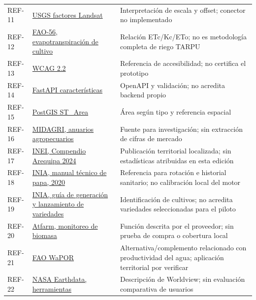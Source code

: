 \documentclass[10pt,a4paper]{article}
\begin{document}
\begin{longtable}{>{\raggedright\arraybackslash}p{3.647cm}>{\raggedright\arraybackslash}p{5.867cm}>{\raggedright\arraybackslash}p{6.343cm}}
REF-11 & \href{https://www.usgs.gov/faqs/how-do-i-use-a-scale-factor-landsat-level-2-science-products}{USGS factores Landsat} & Interpretación de escala y offset; conector no implementado \\[3pt]
REF-12 & \href{https://www.fao.org/4/X0490E/x0490e0a.htm}{FAO-56, evapotranspiración de cultivo} & Relación ETc/\allowbreak{}Kc/\allowbreak{}ETo; no es metodología completa de riego TARPU \\[3pt]
REF-13 & \href{https://www.w3.org/TR/WCAG22/}{WCAG 2.2} & Referencia de accesibilidad; no certifica el prototipo \\[3pt]
REF-14 & \href{https://fastapi.tiangolo.com/features/}{FastAPI características} & OpenAPI y validación; no acredita backend propio \\[3pt]
REF-15 & \href{https://postgis.net/docs/ST_Area.html}{PostGIS ST\_\allowbreak{}Area} & Área según tipo y referencia espacial \\[3pt]
REF-16 & \href{https://www.gob.pe/institucion/midagri/colecciones/5149-anuarios-estadisticas-de-produccion-agropecuaria}{MIDAGRI, anuarios agropecuarios} & Fuente para investigación; sin extracción de cifras de mercado \\[3pt]
REF-17 & \href{https://www.gob.pe/institucion/inei/informes-publicaciones/6453267-compendio-estadistico-arequipa-2024}{INEI, Compendio Arequipa 2024} & Publicación territorial localizada; sin estadísticas atribuidas en esta edición \\[3pt]
REF-18 & \href{https://repositorio.inia.gob.pe/handle/20.500.12955/1146}{INIA, manual técnico de papa, 2020} & Referencia para rotación e historial sanitario; no calibración local del motor \\[3pt]
REF-19 & \href{https://repositorio.inia.gob.pe/bitstreams/0d597e50-7526-41fe-92a5-d158d88bff55/download}{INIA, guía de generación y lanzamiento de variedades} & Identificación de cultivos; no acredita variedades seleccionadas para el piloto \\[3pt]
REF-20 & \href{https://support.at.farm/hc/es-es/articles/18253470818332--C\%C3\%B3mo-puedo-monitorear-la-biomasa-de-mi-parcela}{Atfarm, monitoreo de biomasa} & Función descrita por el proveedor; sin prueba de compra o cobertura local \\[3pt]
REF-21 & \href{https://www.fao.org/land-water/resources/tools/databases/wapor/en}{FAO WaPOR} & Alternativa/\allowbreak{}complemento relacionado con productividad del agua; aplicación territorial por verificar \\[3pt]
REF-22 & \href{https://www.earthdata.nasa.gov/home}{NASA Earthdata, herramientas} & Descripción de Worldview; sin evaluación comparativa de usuarios \\[3pt]
\end{longtable}
\endgroup
\end{document}
